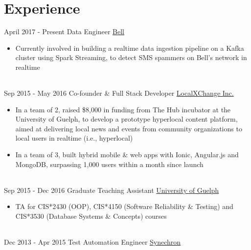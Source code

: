 \documentclass[letterpaper]{tenseconds} %
\begin{document}
\section{Experience}
\begin{twenty} %
\twentyitem
        {April 2017 -}
        {Present}
        {Data Engineer}
        {\href{http://www.bell.ca/}{Bell}}
        {}
        {\begin{itemize}
        \item Currently involved in building a realtime data ingestion pipeline on a Kafka cluster using Spark Streaming, to detect SMS spammers on Bell's network in realtime
        \end{itemize}}
        \\
    \twentyitem
        {Sep 2015 -}
        {May 2016}
        {Co-founder \& Full Stack Developer}
        {\href{http://www.localxchange.ca/}{LocalXChange Inc.}}
        {}
        {
        {\begin{itemize}
        \item In a team of 2, raised \$8,000 in funding from The Hub incubator at the University of Guelph, to develop a prototype hyperlocal content platform, aimed at delivering local news and events from community organizations to local users in realtime (i.e., hyperlocal)
        \item In a team of 3, built hybrid mobile \& web apps with Ionic, Angular.js and MongoDB, surpassing 1,000 users within a month since launch
    \end{itemize}}
        }
    \\   
    \twentyitem
        {Sep 2015 -}
        {Dec 2016}
        {Graduate Teaching Assistant}
        {\href{http://www.uoguelph.ca}{University of Guelph}}
        {}
        {
        {\begin{itemize}
        \item TA for CIS*2430 (OOP), CIS*4150 (Software Reliability \& Testing) and CIS*3530 (Database Systems \& Concepts) courses
    \end{itemize}}
        }
     \\
     \twentyitem
        {Dec 2013 -}
        {Apr 2015}
        {Test Automation Engineer}
        {\href{http://www.synechron.com/}{Synechron}}
        {}
        {
        \begin{itemize}

\end{itemize}}
\end{twenty}
\end{document}
